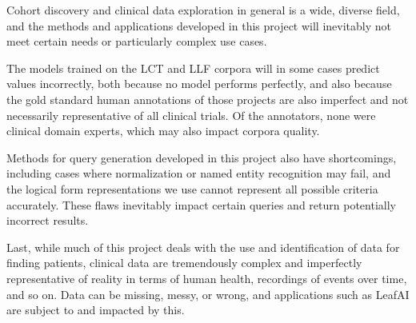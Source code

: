 \documentclass[../main.tex]{subfiles}
\begin{document}
Cohort discovery and clinical data exploration in general is a wide, diverse field, and the methods and applications developed in this project will inevitably not meet certain needs or particularly complex use cases. 

The models trained on the LCT and LLF corpora will in some cases predict values incorrectly, both because no model performs perfectly, and also because the gold standard human annotations of those projects are also imperfect and not necessarily representative of all clinical trials. Of the annotators, none were clinical domain experts, which may also impact corpora quality.

Methods for query generation developed in this project also have shortcomings, including cases where normalization or named entity recognition may fail, and the logical form representations we use cannot represent all possible criteria accurately. These flaws inevitably impact certain queries and return potentially incorrect results.

Last, while much of this project deals with the use and identification of data for finding patients, clinical data are tremendously complex and imperfectly representative of reality in terms of human health, recordings of events over time, and so on. Data can be missing, messy, or wrong, and applications such as LeafAI are subject to and impacted by this.
\end{document}

